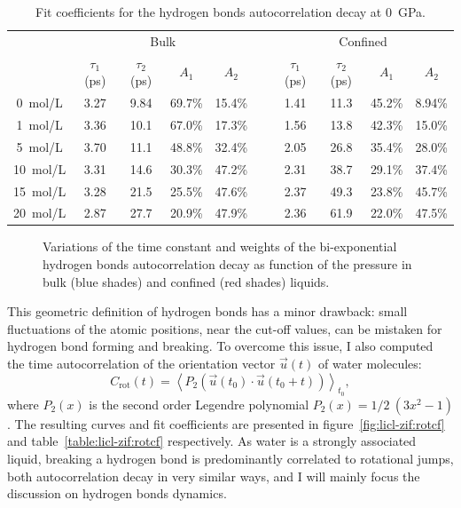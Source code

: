 \documentclass[thesis]{subfiles}
\begin{document}
\begin{table}[b]
    \caption{Fit coefficients for the hydrogen bonds autocorrelation decay at \SI{0}{GPa}.}
    \label{table:licl-zif:hbonds}
    \centering
    \begin{tabular}{c c c c c c c c c c}
        \toprule
        \multicolumn{1}{c}{~} & \multicolumn{4}{c}{Bulk}                          &~& \multicolumn{4}{c}{Confined} \\
        \multicolumn{1}{c}{~} & $\tau_1$ (ps) & $\tau_2$ (ps) & $A_1$   & $A_2$   &~& $\tau_1$ (ps) & $\tau_2$ (ps) & $A_1$   & $A_2$   \\
        \midrule
        \SI{0}{mol/L}         &    3.27       &    9.84       & 69.7\% & 15.4\% &~&  1.41         &  11.3         & 45.2\% & 8.94\% \\
        \SI{1}{mol/L}         &    3.36       &    10.1       & 67.0\% & 17.3\% &~&  1.56         &  13.8         & 42.3\% & 15.0\% \\
        \SI{5}{mol/L}         &    3.70       &    11.1       & 48.8\% & 32.4\% &~&  2.05         &  26.8         & 35.4\% & 28.0\% \\
        \SI{10}{mol/L}        &    3.31       &    14.6       & 30.3\% & 47.2\% &~&  2.31         &  38.7         & 29.1\% & 37.4\% \\
        \SI{15}{mol/L}        &    3.28       &    21.5       & 25.5\% & 47.6\% &~&  2.37         &  49.3         & 23.8\% & 45.7\% \\
        \SI{20}{mol/L}        &    2.87       &    27.7       & 20.9\% & 47.9\% &~&  2.36         &  61.9         & 22.0\% & 47.5\% \\
        \bottomrule
    \end{tabular}
\end{table}

\begin{figure}[ht]
    \centering
    
    \caption{Variations of the time constant and weights of the bi-exponential
    hydrogen bonds autocorrelation decay as function of the pressure in bulk
    (blue shades) and confined (red shades) liquids.}
    \label{fig:licl-zif:hbonds:fit:pressure}
\end{figure}

\newpage
This geometric definition of hydrogen bonds has a minor drawback: small
fluctuations of the atomic positions, near the cut-off values, can be mistaken
for hydrogen bond forming and breaking. To overcome this issue, I also
computed the time autocorrelation of the orientation vector $\vec u(t)$ of
water molecules:
\[C_{\text{rot}}(t) = \left\langle P_2(\vec u(t_0) \cdot \vec u(t_0 + t)) \right\rangle_{t_0} ,\]
where $P_2(x)$ is the second order Legendre polynomial $P_2(x) = 1/2\ (3x^2 -
1)$\cite{Fogarty2014}. The resulting curves and fit coefficients are presented
in figure~\ref{fig:licl-zif:rotcf} and table~\ref{table:licl-zif:rotcf}
respectively. As water is a strongly associated liquid, breaking a hydrogen bond
is predominantly correlated to rotational jumps, both autocorrelation decay in
very similar ways, and I will mainly focus the discussion on hydrogen bonds
dynamics.
\end{document}
